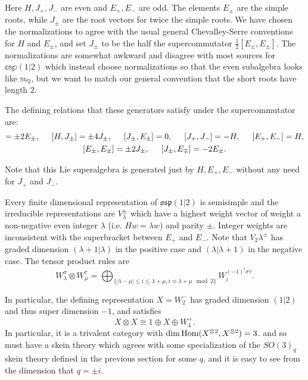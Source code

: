 \documentclass[12pt]{amsart}
\begin{document}
Here $H, J_+, J_-$ are even and $E_+, E_-$ are odd.  The elements $E_\pm$ are the simple roots, while $J_\pm$ are the root vectors for twice the simple roots.  We have chosen the normalizations to agree with the usual general Chevalley-Serre conventions for $H$ and $E_\pm$, and set $J_\pm$ to be the half the supercommutator $\frac{1}{2} [E_\pm, E_\pm]$.  The normalizations are somewhat awkward and disagree with most sources for $\mathbb{osp}(1|2)$ which instead choose normalizations so that the even subalgebra looks like $\mathbb{su}_2$, but we want to match our general convention that the short roots have length $2$.
  
The defining relations that these generators satisfy under the supercommutator are: 
\begin{multline*}[H, E_\pm] = \pm 2 E_\pm, \hspace{.2in} [H, J_\pm] = \pm 4 J_\pm, \hspace{.2in} 
[J_\pm, E_\pm] = 0, \hspace{.2in} [J_+,J_-] = -H, \hspace{.2in} [E_+,E_-] = H, \\ [E_\pm,E_\pm] = \pm 2 J_\pm, \hspace{.2in} [J_\pm, E_\mp] = -2 E_\pm.\end{multline*}

Note that this Lie superalgebra is generated just by $H, E_+, E_-$ without any need for $J_+$ and $J_-$.

Every finite dimensional representation of $\mathfrak{osp}(1|2)$ is semisimple and the irreducible representations are $V_\lambda^\pm$ which have a highest weight vector of weight a non-negative even integer $\lambda$ (i.e. $H w = \lambda w$) and parity $\pm$.  Integer weights are inconsistent with the superbracket between $E_+$ and $E_-$.  Note that $V_2\lambda^\pm$ has graded dimension $(\lambda+1 | \lambda)$ in the positive case and $(\lambda | \lambda+1)$ in the negative case.  The tensor product rules are 
$$W_\lambda^\sigma \otimes W_\mu^\tau =  \bigoplus_{\{|\lambda-\mu| \leq i \leq \lambda+\mu, i \equiv \lambda + \mu \mod 2\}} W_i^{{(-1)}^i \sigma \tau}.$$

In particular, the defining representation $X = W_2^-$ has graded dimension $(1|2)$ and thus super dimension $-1$, and satisfies
$$X \otimes X \cong 1 \oplus X \oplus W_4^+.$$  In particular, it is a trivalent category with $\dim \operatorname{Hom}(X^{\otimes 2}, X^{\otimes 2}) = 3$. and so must have a skein theory which agrees with some specialization of the $SO(3)_q$ skein theory defined in the previous section for some $q$, and it is easy to see from the dimension that $q = \pm i$.
\end{document}
